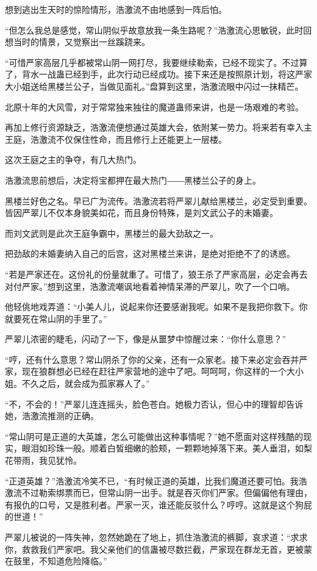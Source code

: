 \begin{this_body}
想到逃出生天时的惊险情形，浩激流不由地感到一阵后怕。

“但怎么我总是感觉，常山阴似乎故意放我一条生路呢？”浩激流心思敏锐，此时回想当时的情景，又觉察出一丝蹊跷来。

“可惜严家高层几乎都被常山阴一网打尽，我要继续勒索，已经不现实了。不过算了，背水一战蛊已经到手，此次行动已经成功。接下来还是按照原计划，将这严家大小姐送给黑楼兰公子，当做见面礼。”盘算到这里，浩激流眼中闪过一抹精芒。

北原十年的大风雪，对于常常独来独往的魔道蛊师来讲，也是一场艰难的考验。

再加上修行资源缺乏，浩激流便想通过英雄大会，依附某一势力。将来若有幸入主王庭，浩激流不仅保住性命，而且修行上还能更上一层楼。

这次王庭之主的争夺，有几大热门。

浩激流思前想后，决定将宝都押在最大热门――黑楼兰公子的身上。

黑楼兰好色之名。早已广为流传。浩激流若将严翠儿献给黑楼兰，必定受到重要。皆因严翠儿不仅本身貌美如花，而且身份特殊，是刘文武公子的未婚妻。

而刘文武则是此次王庭争霸中，黑楼兰的最大劲敌之一。

把劲敌的未婚妻纳入自己的后宫，这对黑楼兰来讲，是绝对拒绝不了的诱惑。

“若是严家还在。这份礼的份量就重了。可惜了，狼王杀了严家高层，必定会再去对付严家。”想到这里，浩激流嘲讽地看着神情呆滞的严翠儿，吹了一个口哨。

他轻佻地戏弄道：“小美人儿，说起来你还要感谢我呢。如果不是我把你救下。你就要死在常山阴的手里了。”

严翠儿浓密的睫毛，闪动了一下，像是从噩梦中惊醒过来：“你什么意思？”

“哼，还有什么意思？常山阴杀了你的父亲，还有一众家老。接下来必定会吞并严家，现在狼群想必已经在赶往严家营地的途中了吧。呵呵呵，你这样的一个大小姐。不久之后，就会成为孤家寡人了。”

“不，不会的！”严翠儿连连摇头，脸色苍白。她极力否认，但心中的理智却告诉她，浩激流推测的正确。

“常山阴可是正道的大英雄，怎么可能做出这种事情呢？”她不愿面对这样残酷的现实，眼泪如珍珠一般。顺着白皙细嫩的脸颊，一颗颗地掉落下来。美人垂泪，如梨花带雨，我见犹怜。

“正道英雄？”浩激流冷笑不已，“有时候正道的英雄，比我们魔道还要可怕。我浩激流不过勒索绑票而已，但常山阴一出手。就是吞灭你们严家。但偏偏他有理由，有报仇的口号，又是胜利者。严家一灭，谁还能反驳什么？哼哼。这就是这个狗屁的世道！”

严翠儿被说的一阵失神，忽然她跪在了地上，抓住浩激流的裤脚，哀求道：“求求你，救救我们严家吧。我父亲他们的信蛊被尽数拦截，严家现在群龙无首，更被蒙在鼓里，不知道危险降临。”


\end{this_body}
